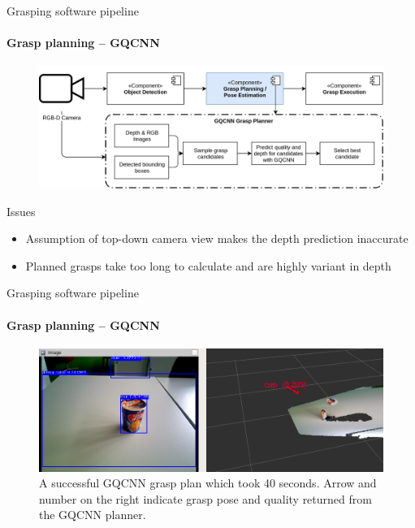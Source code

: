 \documentclass{beamer}
\begin{document}
\begin{frame}{Grasping software pipeline}
    \framesubtitle{Grasp planning -- GQCNN}
    \begin{figure}[b]
        \centering
        \includegraphics[width=0.8\linewidth]{grasp_pipeline_gqcnn}
    \end{figure}
\begin{exampleblock}{Issues}
    \begin{itemize}
        \item Assumption of top-down camera view makes the depth prediction inaccurate
        \item Planned grasps take too long to calculate and are highly variant in depth
    \end{itemize}
\end{exampleblock}
\end{frame}

\begin{frame}{Grasping software pipeline}
\framesubtitle{Grasp planning -- GQCNN}%
    \begin{figure}[b]
    \centering
    \includegraphics[width=0.9\linewidth]{grasp_gqcnn_result}
    \caption{\small A successful GQCNN grasp plan which took 40 seconds. Arrow and number on the right indicate grasp
        pose and quality returned from the GQCNN planner.}
    \label{fig:gqcnn_result}
    \end{figure}
\end{frame}
\end{document}
